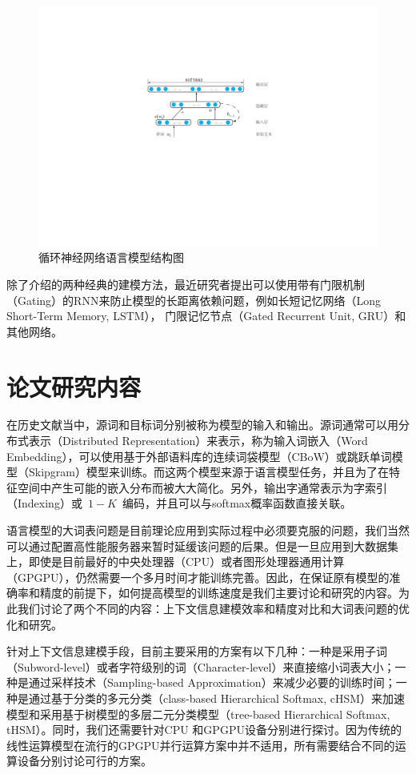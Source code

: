 \begin{figure}
  \centering
  \includegraphics[width=.8\linewidth]{./figures/rnnlm.pdf}
  \caption{循环神经网络语言模型结构图}\label{fig:rnnlm}
\end{figure}


除了介绍的两种经典的建模方法，最近研究者提出可以使用带有门限机制（Gating）的RNN来防止模型的长距离依赖问题，例如长短记忆网络（Long Short-Term Memory, LSTM）， 门限记忆节点（Gated Recurrent Unit, GRU）和其他网络。


\section{论文研究内容}
在历史文献当中，源词和目标词分别被称为模型的输入和输出。源词通常可以用分布式表示（Distributed Representation）来表示，称为输入词嵌入（Word Embedding），可以使用基于外部语料库的连续词袋模型（CBoW）或跳跃单词模型（Skipgram）模型来训练。而这两个模型来源于语言模型任务，并且为了在特征空间中产生可能的嵌入分布而被大大简化。另外，输出字通常表示为字索引（Indexing）或~$1-K$~编码，并且可以与softmax概率函数直接关联。

语言模型的大词表问题是目前理论应用到实际过程中必须要克服的问题，我们当然可以通过配置高性能服务器来暂时延缓该问题的后果。但是一旦应用到大数据集上，即使是目前最好的中央处理器（CPU）或者图形处理器通用计算（GPGPU），仍然需要一个多月时间才能训练完善。因此，在保证原有模型的准确率和精度的前提下，如何提高模型的训练速度是我们主要讨论和研究的内容。为此我们讨论了两个不同的内容：上下文信息建模效率和精度对比和大词表问题的优化和研究。

针对上下文信息建模手段，目前主要采用的方案有以下几种：一种是采用子词（Subword-level）或者字符级别的词（Character-level）来直接缩小词表大小；一种是通过采样技术（Sampling-based Approximation）来减少必要的训练时间；一种是通过基于分类的多元分类（class-based Hierarchical Softmax, cHSM）来加速模型和采用基于树模型的多层二元分类模型（tree-based Hierarchical Softmax, tHSM）。同时，我们还需要针对CPU 和GPGPU设备分别进行探讨。因为传统的线性运算模型在流行的GPGPU并行运算方案中并不适用，所有需要结合不同的运算设备分别讨论可行的方案。

